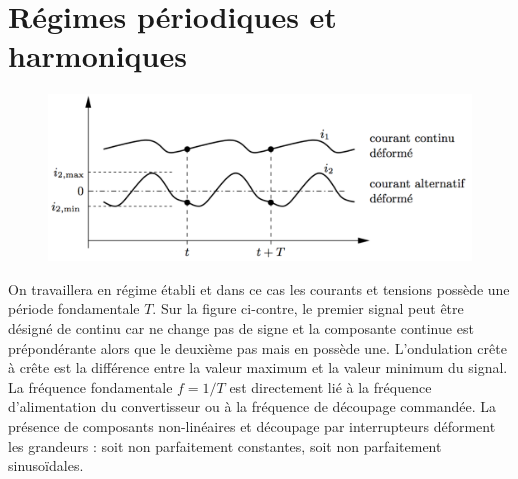 \section{Régimes périodiques et harmoniques}
	\begin{figure}
	\vspace{-5mm}
	\includegraphics[scale=0.25]{ch1/6}
	\end{figure}
	On travaillera en régime établi et dans ce cas les courants et tensions possède une période fondamentale $T$. Sur la figure ci-contre, le premier signal peut être désigné de continu car ne change pas de signe et la composante continue est prépondérante alors que le deuxième pas mais en possède une.
	L'ondulation crête à crête est la différence entre la valeur maximum et la valeur minimum du signal. La fréquence fondamentale $f=1/T$ est directement lié à la fréquence d'alimentation du convertisseur ou à la fréquence de découpage commandée. La présence de composants non-linéaires et découpage par interrupteurs déforment les grandeurs : soit non parfaitement constantes, soit non parfaitement sinusoïdales. 
		
